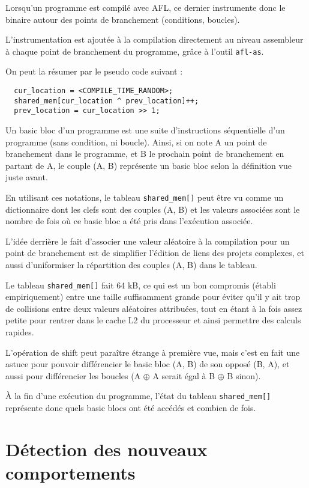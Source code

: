 Lorsqu'un programme est compilé avec AFL, ce dernier instrumente donc le
binaire autour des points de branchement (conditions, boucles).

L'instrumentation est ajoutée à la compilation directement au niveau
assembleur à chaque point de branchement du programme, grâce à l'outil
\lstinline{afl-as}.

On peut la résumer par le pseudo code suivant :

\begin{lstlisting}
  cur_location = <COMPILE_TIME_RANDOM>;
  shared_mem[cur_location ^ prev_location]++;
  prev_location = cur_location >> 1;
\end{lstlisting}

Un basic bloc d'un programme est une suite d'instructions séquentielle d'un
programme (sans condition, ni boucle). Ainsi, si on note A un point de
branchement dans le programme, et B le prochain point de branchement en
partant de A, le couple (A, B) représente un basic bloc selon la définition
vue juste avant.

En utilisant ces notations, le tableau \lstinline{shared_mem[]} peut être vu
comme un dictionnaire dont les clefs sont des couples (A, B) et les valeurs
associées sont le nombre de fois où ce basic bloc a été pris dans
l'exécution associée.

L'idée derrière le fait d'associer une valeur aléatoire à la compilation
pour un point de branchement est de simplifier l'édition de liens des
projets complexes, et aussi d'uniformiser la répartition des couples
(A, B) dans le tableau.

Le tableau \lstinline{shared_mem[]} fait 64 kB, ce qui est un bon compromis
(établi empiriquement) entre une taille suffisamment grande pour éviter qu'il y
ait trop de collisions entre deux valeurs aléatoires attribuées, tout en
étant à la fois assez petite pour rentrer dans le cache L2 du processeur
et ainsi permettre des calculs rapides.

L'opération de shift peut paraître étrange à première vue, mais c'est en
fait une astuce pour pouvoir différencier le basic bloc (A, B) de
son opposé (B, A), et aussi pour différencier les boucles
(A $\oplus$ A serait égal à B $\oplus$ B sinon).

À la fin d'une exécution du programme, l'état du tableau
\lstinline{shared_mem[]} représente donc quels basic blocs ont été accédés
et combien de fois.

\section{Détection des nouveaux comportements}\label{nouveaux_comportements}

